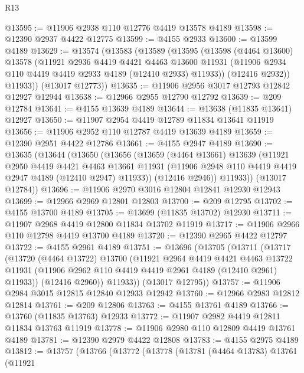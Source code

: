 \begin{lexlean}{R13}
\begin{coremodule}
@13595 := @11906 @2938 @110 @12776 @4419 @13578 @4189
@13598 := @12390 @2937 @4422 @12775
@13599 := @4155 @2933
@13600 := @13599 @4189
@13629 := @13574
    (@13583
      (@13589
        (@13595
          (@13598
            (@4464 @13600)
            @13578
            (@11921
              @2936
              @4419
              @4421
              @4463
              @13600
              @11931
              (@11906 @2934 @110 @4419 @4419 @2933 @4189 (@12410 @2933) @11933))
            (@12416 @2932))
          @11933))
      (@13017 @12773))
@13635 := @11906 @2956 @3017 @12793 @12842 @12927 @12944
@13638 := @12966 @2955 @12790 @12792
@13639 := @209 @12784
@13641 := @4155 @13639 @4189
@13644 := @13638 (@11835 @13641) @12927
@13650 := @11907 @2954 @4419 @12789 @11834 @13641 @11919
@13656 := @11906 @2952 @110 @12787 @4419 @13639 @4189
@13659 := @12390 @2951 @4422 @12786
@13661 := @4155 @2947 @4189
@13690 := @13635
    (@13644
      (@13650
        (@13656
          (@13659
            (@4464 @13661)
            @13639
            (@11921
              @2950
              @4419
              @4421
              @4463
              @13661
              @11931
              (@11906 @2948 @110 @4419 @4419 @2947 @4189 (@12410 @2947) @11933))
            (@12416 @2946))
          @11933))
      (@13017 @12784))
@13696 := @11906 @2970 @3016 @12804 @12841 @12930 @12943
@13699 := @12966 @2969 @12801 @12803
@13700 := @209 @12795
@13702 := @4155 @13700 @4189
@13705 := @13699 (@11835 @13702) @12930
@13711 := @11907 @2968 @4419 @12800 @11834 @13702 @11919
@13717 := @11906 @2966 @110 @12798 @4419 @13700 @4189
@13720 := @12390 @2965 @4422 @12797
@13722 := @4155 @2961 @4189
@13751 := @13696
    (@13705
      (@13711
        (@13717
          (@13720
            (@4464 @13722)
            @13700
            (@11921
              @2964
              @4419
              @4421
              @4463
              @13722
              @11931
              (@11906 @2962 @110 @4419 @4419 @2961 @4189 (@12410 @2961) @11933))
            (@12416 @2960))
          @11933))
      (@13017 @12795))
@13757 := @11906 @2984 @3015 @12815 @12840 @12933 @12942
@13760 := @12966 @2983 @12812 @12814
@13761 := @209 @12806
@13763 := @4155 @13761 @4189
@13766 := @13760 (@11835 @13763) @12933
@13772 := @11907 @2982 @4419 @12811 @11834 @13763 @11919
@13778 := @11906 @2980 @110 @12809 @4419 @13761 @4189
@13781 := @12390 @2979 @4422 @12808
@13783 := @4155 @2975 @4189
@13812 := @13757
    (@13766
      (@13772
        (@13778
          (@13781
            (@4464 @13783)
            @13761
            (@11921

\end{coremodule}
\end{lexlean}
